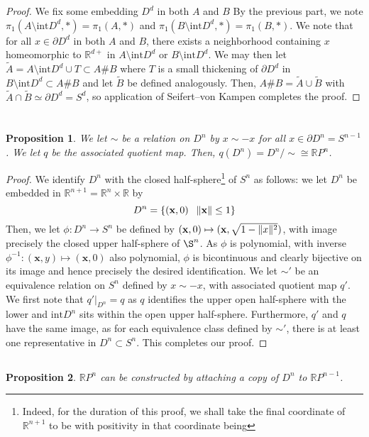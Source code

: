 \documentclass[english]{article}
\renewcommand\vec{\mathbf}
\newcommand{\evat}[3]{\left. #1\right|_{#2}^{#3}}
\newcommand{\restr}[2]{\evat{#1}{#2}{}}
\DeclarePairedDelimiter\norm{\lVert}{\rVert}%
\newcommand{\RR}{\mathbb{R}}
\newcommand{\prob}[1]{\setcounter{section}{#1-1}\section{}}
\newcommand{\prt}[1]{\setcounter{subsection}{#1-1}\subsection{}}
\newtheorem*{proposition*}{Proposition}
\theoremstyle{remark}
\theoremstyle{definition}
\newcommand{\intr}{\mathrm{int}}
\newcommand{\bdy}{\partial}
\begin{document}
	\begin{proof} We fix some embedding $D^d$ in both $A$ and $B$
		By the previous part, we note $\pi_1(A\setminus \intr D^d,*)=\pi_1(A,*)$ and $\pi_1(B\setminus\intr D^d,*)=\pi_1(B,*)$. We note that for all $x\in \bdy D^d$ in both $A$ and $B$, there exists a neighborhood containing $x$ homeomorphic to $\RR^{d+}$ in $A\setminus\intr D^d$ or $B\setminus \intr D^d$. We may then let $\tilde A= A\setminus \intr D^d\cup T\subset A\#B$ where $T$ is a small thickening of $\bdy D^d$ in $B\setminus \intr D^d\subset A\#B$ and let $\tilde B$ be defined analogously. Then, $A\# B=\tilde A\cup \tilde B$ with $\tilde A\cap\tilde B\simeq \bdy D^d=S^d$, so application of Seifert--von Kampen completes the proof.  
	\end{proof}
	\prob{2}
	\prt{1} \begin{proposition*}
		We let $\sim$ be a relation on $D^n$ by $x\sim -x$ for all $x\in \bdy D^n=S^{n-1}$. We let $q$ be the associated quotient map. Then, $q(D^n)=D^n/\sim\cong \RR P^n$.
	\end{proposition*}
	\begin{proof}
		We identify $D^n$ with the closed  half-sphere\footnote{Indeed, for the duration of this proof, we shall take the final coordinate of $\RR^{n+1}$ to be  with positivity in that coordinate being } of $S^n$ as follows: we let $D^n$ be embedded in $\RR^{n+1}=\RR^n\times \RR$ by $$D^n=\left\{(\vec{x},0)\;\:\;\norm{\vec{x}}\leq 1\right\}$$
		Then, we let $\phi:D^n\to S^n$ be defined by $(\vec{x},0)\mapsto (\vec{x},\sqrt{1-\norm{x}^2})$, with image precisely the closed upper half-sphere of $\S^n$. As $\phi$ is polynomial, with inverse $\phi^{-1}:(\vec{x},y)\mapsto (\vec{x},0)$ also polynomial, $\phi$ is bicontinuous and clearly bijective on its image and hence precisely the desired identification. We let $\sim'$ be an equivalence relation on $S^n$ defined by $x\sim -x$, with associated quotient map $q'$. We first note that $\restr{q'}{D^n}=q$ as $q$ identifies the upper open half-sphere with the lower and $\intr D^n$ sits within the open upper half-sphere. Furthermore, $q'$ and $q$ have the same image, as for each equivalence class defined by $\sim'$, there is at least one representative in $D^n\subset S^n$. This completes our proof.
	\end{proof}
	\prt{2} \begin{proposition*}
		$\RR P^n$ can be constructed by attaching a copy of $D^n$ to $\RR P^{n-1}$.
	\end{proposition*}
\end{document}
